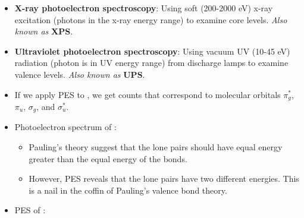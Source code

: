 \documentclass[../notes.tex]{subfiles}
\begin{document}
\begin{itemize}
\begin{figure}[h!]
\begin{subfigure}[b]{0.45\linewidth}
            \caption{Final state.}
            \label{fig:PES-atomicb}
        \end{subfigure}
        \caption{Photoelectron spectroscopy at an atomic level.}
        \label{fig:PES-atomic}
    \end{figure}
    \begin{itemize}
        \item A sample (solid, liquid, or gas) is impinged upon by a focused beam of X-rays (say of $\SI{1.5}{\kilo\volt}$).
        \item When the sample is exposed to the X-rays, electrons fly out of the sample. The KE of these electrons can be measured.
        \item Essentially, $h\nu$ takes an electron from the core level to above the vacuum level. We know $h\nu$ and we measure $KE_\text{electron}$, allowing us to calculate the bonding energy of the electron: $h\nu=I_\text{BE}+E_\text{kinetic}$ (see Figure \ref{fig:PES-atomic}).
    \end{itemize}
    \item \textbf{X-ray photoelectron spectroscopy}: Using soft (200-2000 eV) x-ray excitation (photons in the x-ray energy range) to examine core levels. \emph{Also known as} \textbf{XPS}.
    \item \textbf{Ultraviolet photoelectron spectroscopy}: Using vacuum UV (10-45 eV) radiation (photon is in UV energy range) from discharge lamps to examine valence levels. \emph{Also known as} \textbf{UPS}.
    \item If we apply PES to , we get counts that correspond to molecular orbitals $\pi_g^*$, $\pi_u$, $\sigma_g$, and $\sigma_u^*$.
    \item Photoelectron spectrum of :
    \begin{itemize}
        \item Pauling's theory suggest that the lone pairs should have equal energy greater than the equal energy of the bonds.
        \item However, PES reveals that the lone pairs have two different energies. This is a nail in the coffin of Pauling's valence bond theory.
    \end{itemize}
    \item PES of :

\end{itemize}
\end{document}
